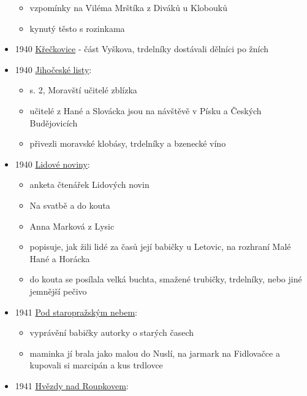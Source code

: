 \begin{itemize}
  \begin{itemize}
  \tightlist
  \item
    vzpomínky na Viléma Mrštíka z Diváků u Klobouků
  \item
    kynutý těsto s rozinkama
  \end{itemize}
\item
  1940
  \href{https://ceskadigitalniknihovna.cz/view/uuid:d065e200-90ad-11e8-87bd-005056827e52?page=uuid:47609990-a79c-11e8-ba56-5ef3fc9bb22f&fulltext=trdeln\%C3\%ADky&source=nkp}{Křečkovice}
  - část Vyškova, trdelníky dostávali dělníci po žních
\item
  1940
  \href{https://ceskadigitalniknihovna.cz/uuid/uuid:c6220b36-bdd1-4eec-94b2-2bed755a042a}{Jihočeské
  listy}:

  \begin{itemize}
  \tightlist
  \item
    s. 2, Moravští učitelé zblízka
  \item
    učitelé z Hané a Slovácka jsou na návštěvě v Písku a Českých
    Budějovicích
  \item
    přivezli moravské klobásy, trdelníky a bzenecké víno
  \end{itemize}
\item
  1940
  \href{https://ceskadigitalniknihovna.cz/uuid/uuid:9582fdd0-6e03-11dd-a59e-000d606f5dc6}{Lidové
  noviny}:

  \begin{itemize}
  \tightlist
  \item
    anketa čtenářek Lidových novin
  \item
    Na svatbě a do kouta
  \item
    Anna Marková z Lysic
  \item
    popisuje, jak žili lidé za časů její babičky u Letovic, na rozhraní
    Malé Hané a Horácka
  \item
    do kouta se posílala velká buchta, smažené trubičky, trdelníky, nebo
    jiné jemnější pečivo
  \end{itemize}
\item
  1941
  \href{https://ceskadigitalniknihovna.cz/view/uuid:5247f390-0408-11ed-bd12-005056827e51?page=uuid\%3Ac9bca5eb-64b6-4861-a251-c29522db0865&fulltext=trdlovce&source=mzk}{Pod
  staropražským nebem}:

  \begin{itemize}
  \tightlist
  \item
    vyprávění babičky autorky o starých časech
  \item
    maminka jí brala jako malou do Nuslí, na jarmark na Fidlovačce a
    kupovali si marcipán a kus trdlovce
  \end{itemize}
\item
  1941
  \href{https://ceskadigitalniknihovna.cz/view/uuid:5a644b90-81df-11e4-9d8c-005056827e51?page=uuid\%3A645f2680-95c9-11e4-a2db-005056825209&source=nkp}{Hvězdy
  nad Roupkovem}:


\end{itemize}

